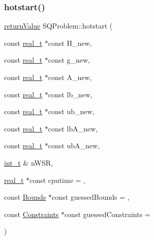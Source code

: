 \subsubsection{\texorpdfstring{hotstart()}{hotstart()}\hspace{0.1cm}{\footnotesize\ttfamily [2/5]}}
{\footnotesize\ttfamily \hyperlink{_message_handling_8hpp_a81d556f613bfbabd0b1f9488c0fa865e}{return\+Value} S\+Q\+Problem\+::hotstart (\begin{DoxyParamCaption}\item[{const \hyperlink{qp_o_a_s_e_s__wrapper_8h_a0d00e2b3dfadee81331bbb39068570c4}{real\+\_\+t} $\ast$const}]{H\+\_\+new,  }\item[{const \hyperlink{qp_o_a_s_e_s__wrapper_8h_a0d00e2b3dfadee81331bbb39068570c4}{real\+\_\+t} $\ast$const}]{g\+\_\+new,  }\item[{const \hyperlink{qp_o_a_s_e_s__wrapper_8h_a0d00e2b3dfadee81331bbb39068570c4}{real\+\_\+t} $\ast$const}]{A\+\_\+new,  }\item[{const \hyperlink{qp_o_a_s_e_s__wrapper_8h_a0d00e2b3dfadee81331bbb39068570c4}{real\+\_\+t} $\ast$const}]{lb\+\_\+new,  }\item[{const \hyperlink{qp_o_a_s_e_s__wrapper_8h_a0d00e2b3dfadee81331bbb39068570c4}{real\+\_\+t} $\ast$const}]{ub\+\_\+new,  }\item[{const \hyperlink{qp_o_a_s_e_s__wrapper_8h_a0d00e2b3dfadee81331bbb39068570c4}{real\+\_\+t} $\ast$const}]{lb\+A\+\_\+new,  }\item[{const \hyperlink{qp_o_a_s_e_s__wrapper_8h_a0d00e2b3dfadee81331bbb39068570c4}{real\+\_\+t} $\ast$const}]{ub\+A\+\_\+new,  }\item[{\hyperlink{_types_8hpp_ab6fd6105e64ed14a0c9281326f05e623}{int\+\_\+t} \&}]{n\+W\+SR,  }\item[{\hyperlink{qp_o_a_s_e_s__wrapper_8h_a0d00e2b3dfadee81331bbb39068570c4}{real\+\_\+t} $\ast$const}]{cputime = {},  }\item[{const \hyperlink{class_bounds}{Bounds} $\ast$const}]{guessed\+Bounds = {},  }\item[{const \hyperlink{class_constraints}{Constraints} $\ast$const}]{guessed\+Constraints = {} }\end{DoxyParamCaption})}

